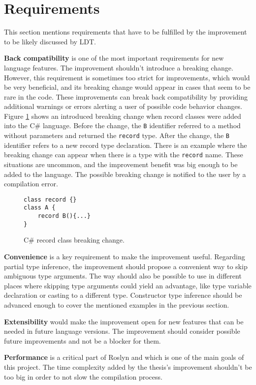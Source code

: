 \section{Requirements}

This section mentions requirements that have to be fulfilled by the improvement to be likely discussed by \ac{LDT}.
\par
\textbf{Back compatibility} is one of the most important requirements for new language features. 
The improvement shouldn’t introduce a breaking change. However, this requirement is sometimes too strict for improvements, which would be very beneficial, and its breaking change would appear in cases that seem to be rare in the code. 
These improvements can break back compatibility by providing additional warnings or errors alerting a user of possible code behavior changes.
Figure \ref{img39:brkCh} shows an introduced breaking change when record classes were added into the C\# language. 
Before the change, the \texttt{B} identifier referred to a method without parameters and returned the \texttt{record} type. 
After the change, the \texttt{B} identifier refers to a new record type declaration. 
There is an example where the breaking change can appear when there is a type with the \texttt{record} name. 
These situations are uncommon, and the improvement benefit was big enough to be added to the language. 
The possible breaking change is notified to the user by a compilation error.
\begin{figure}[h]
\begin{lstlisting}[style=csharp]
class record {}
class A {
    record B(){...}
}
\end{lstlisting}
\caption{C\# record class breaking change.}
\label{img39:brkCh}
\end{figure}
\par
\textbf{Convenience} is a key requirement to make the improvement useful. 
Regarding partial type inference, the improvement should propose a convenient way to skip ambiguous type arguments. 
The way should also be possible to use in different places where skipping type arguments could yield an advantage, like type variable declaration or casting to a different type. 
Constructor type inference should be advanced enough to cover the mentioned examples in the previous section.
\par
\textbf{Extensibility} would make the improvement open for new features that can be needed in future language versions. 
The improvement should consider possible future improvements and not be a blocker for them.
\par
\textbf{Performance} is a critical part of Roslyn and which is one of the main goals of this project.
The time complexity added by the thesis’s improvement shouldn’t be too big in order to not slow the compilation process.